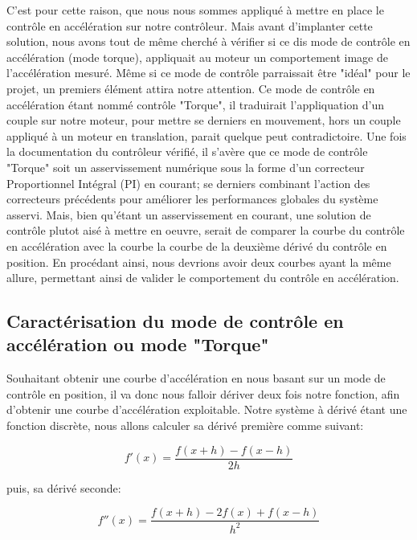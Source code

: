 \documentclass[french,a4paper,12pt]{report}
\begin{document}
	C'est pour cette raison, que nous nous sommes appliqué à mettre en place le contrôle en accélération sur notre contrôleur. Mais avant d'implanter cette solution, nous avons tout de même cherché à vérifier si ce dis mode de contrôle en accélération (mode torque), appliquait au moteur un comportement image de l'accélération mesuré. Même si ce mode de contrôle parraissait être "idéal" pour le projet, un premiers élément attira notre attention. Ce mode de contrôle en accélération étant nommé contrôle "Torque", il traduirait l'appliquation d'un couple sur notre moteur, pour mettre se derniers en mouvement, hors un couple appliqué à un moteur en translation, parait quelque peut contradictoire.
	Une fois la documentation du contrôleur vérifié, il s'avère que ce mode de contrôle "Torque" soit un asservissement numérique sous la forme d'un correcteur Proportionnel Intégral (PI) en courant; se derniers combinant l'action des correcteurs précédents pour améliorer les performances globales du système asservi. Mais, bien qu'étant un asservissement en courant, une solution de contrôle plutot aisé à mettre en oeuvre, serait de comparer la courbe du contrôle en accélération avec la courbe la courbe de la deuxième dérivé du contrôle en position. En procédant ainsi, nous devrions avoir deux courbes ayant la même allure, permettant ainsi de valider le comportement du contrôle en accélération.
	
		\subsection{Caractérisation du mode de contrôle en accélération ou mode "Torque"}

	Souhaitant obtenir une courbe d'accélération en nous basant sur un mode de contrôle en position, il va donc nous falloir dériver deux fois notre fonction, afin d'obtenir une courbe d'accélération exploitable.
	Notre système à dérivé étant une fonction discrète, nous allons calculer sa dérivé première comme suivant: 
	
	\[	
		f'(x) = \frac{f(x+h) - f(x-h)}{2h}
	\]
	
	puis, sa dérivé seconde:
	
	\[	
		f''(x) = \frac{f(x+h) - 2f(x) + f(x-h)}{h^2}
	\]
	
\end{document}
